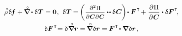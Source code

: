 \nopagebreak\begin{equation}
\label{variationsforcurrentconfiguration}
\begin{array}{c}
\mathcircabove{\rho} \hspace{.25ex} \variation{\hspace{-0.2ex}\bm{f}}
+ \hspace{-0.1ex} \boldnablacircled \hspace{-0.1ex} \dotp \variation{\hspace{.1ex}\firstpiolakirchhoffstress}
= \bm{0}
\hspace{.1ex} , \:\,
%
\variation{\hspace{.1ex}\firstpiolakirchhoffstress} \hspace{-0.1ex}
= \hspace{-0.2ex} \left( \hspace{.1ex} \scalebox{.88}{$ \displaystyle\frac{\partial^2 \hspace{.1ex} \potential}{\raisemath{-0.1em}{\partial \hspace{.1ex} \bm{C} \hspace{.1ex} \partial \hspace{.1ex} \bm{C}}} $} \dotdotp \variation{\hspace{.1ex}\bm{C}} \hspace{-0.15ex} \right) \hspace{-0.3ex} \dotp \bm{F}^{\hspace{.1ex}\T} \hspace{-0.25ex}
+ \hspace{.1ex}
\displaystyle\frac{\partial \hspace{.1ex} \potential}{\raisemath{-0.1em}{\partial \hspace{.1ex} \bm{C}}} \dotp \variation{\bm{F}}^{\hspace{.1ex}\T}
\hspace{-0.4ex} ,
\\[1em]
%
\variation{\bm{F}}^{\hspace{.1ex}\T} \hspace{-0.5ex}
= \variation{\hspace{.1ex} \boldnablacircled \currentlocationvector}
= \hspace{-0.2ex} \boldnablacircled \hspace{.1ex} \variation{\currentlocationvector}
= \hspace{-0.1ex} \bm{F}^{\hspace{.1ex}\T} \hspace{-0.25ex} \dotp \boldnabla \hspace{.1ex} \variation{\currentlocationvector} \hspace{.15ex} ,

\end{array}
\end{equation}
